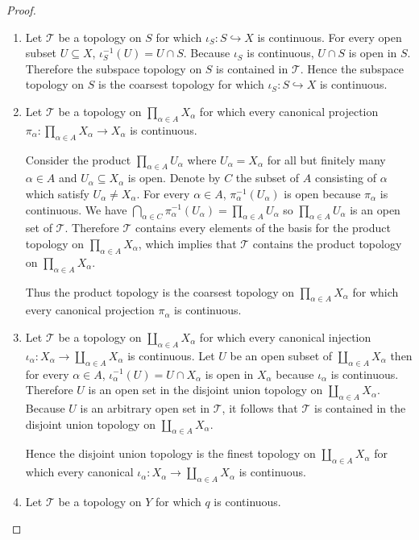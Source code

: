 \begin{proof}
	\begin{enumerate}[label={(\alph*)}]
		\item Let $\mathscr{T}$ be a topology on $S$ for which $\iota_{S}: S\hookrightarrow{} X$ is continuous. For every open subset $U\subseteq X$, $\iota_{S}^{-1}(U) = U\cap S$. Because $\iota_{S}$ is continuous, $U\cap S$ is open in $S$. Therefore the subspace topology on $S$ is contained in $\mathscr{T}$. Hence the subspace topology on $S$ is the coarsest topology for which $\iota_{S}: S\hookrightarrow{} X$ is continuous.
		\item Let $\mathscr{T}$ be a topology on $\prod_{\alpha\in A}X_{\alpha}$ for which every canonical projection $\pi_{\alpha}: \prod_{\alpha\in A}X_{\alpha} \to X_{\alpha}$ is continuous.

		      Consider the product $\prod_{\alpha\in A}U_{\alpha}$ where $U_{\alpha} = X_{\alpha}$ for all but finitely many $\alpha\in A$ and $U_{\alpha}\subseteq X_{\alpha}$ is open. Denote by $C$ the subset of $A$ consisting of $\alpha$ which satisfy $U_{\alpha}\ne X_{\alpha}$. For every $\alpha\in A$, $\pi_{\alpha}^{-1}(U_{\alpha})$ is open because $\pi_{\alpha}$ is continuous. We have $\bigcap_{\alpha\in C}\pi_{\alpha}^{-1}(U_{\alpha}) = \prod_{\alpha\in A}U_{\alpha}$ so $\prod_{\alpha\in A}U_{\alpha}$ is an open set of $\mathscr{T}$. Therefore $\mathscr{T}$ contains every elements of the basis for the product topology on $\prod_{\alpha\in A}X_{\alpha}$, which implies that $\mathscr{T}$ contains the product topology on $\prod_{\alpha\in A}X_{\alpha}$.

		      Thus the product topology is the coarsest topology on $\prod_{\alpha\in A}X_{\alpha}$ for which every canonical projection $\pi_{\alpha}$ is continuous.
		\item Let $\mathscr{T}$ be a topology on $\coprod_{\alpha\in A}X_{\alpha}$ for which every canonical injection $\iota_{\alpha}: X_{\alpha}\to \coprod_{\alpha\in A}X_{\alpha}$ is continuous. Let $U$ be an open subset of $\coprod_{\alpha\in A}X_{\alpha}$ then for every $\alpha\in A$, $\iota_{\alpha}^{-1}(U) = U\cap X_{\alpha}$ is open in $X_{\alpha}$ because $\iota_{\alpha}$ is continuous. Therefore $U$ is an open set in the disjoint union topology on $\coprod_{\alpha\in A}X_{\alpha}$. Because $U$ is an arbitrary open set in $\mathscr{T}$, it follows that $\mathscr{T}$ is contained in the disjoint union topology on $\coprod_{\alpha\in A}X_{\alpha}$.

		      Hence the disjoint union topology is the finest topology on $\coprod_{\alpha\in A}X_{\alpha}$ for which every canonical $\iota_{\alpha}: X_{\alpha}\to \coprod_{\alpha\in A}X_{\alpha}$ is continuous.
		\item Let $\mathscr{T}$ be a topology on $Y$ for which $q$ is continuous.


\end{enumerate}
\end{proof}
